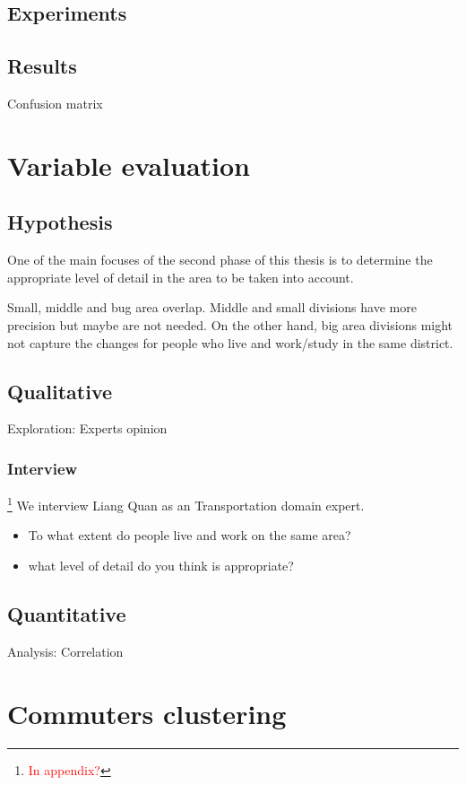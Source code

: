 \documentclass{article}
\newcommand{\selfnote}[1]{\footnote{\textcolor{red}{#1}}}
\begin{document}
\subsection{Experiments}

\subsection{Results}
Confusion matrix


\newpage
\section{Variable evaluation}
\label{sec:partII}
\subsection{Hypothesis}
One of the main focuses of the second phase of this thesis is to determine the appropriate level of detail in the area to be taken into account. 

Small, middle and bug area overlap. Middle and small divisions have more precision but maybe are not needed. On the other hand, big area divisions might not capture the changes for people who live and work/study in the same district. 

\subsection{Qualitative}
Exploration: Experts opinion

\subsubsection{Interview}
\selfnote{In appendix?}
We interview Liang Quan as an Transportation domain expert. 

\begin{itemize}
\item To what extent do people live and work on the same area?
\item what level of detail do you think is appropriate?
\end{itemize}

\subsection{Quantitative}
Analysis: Correlation


\newpage
\section{Commuters clustering}
\label{sec:partIII}
\end{document}
